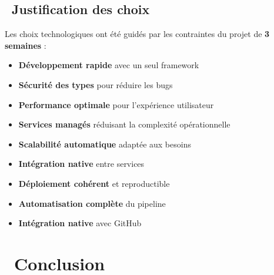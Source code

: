 \subsection{\faCheckCircle\ Justification des choix}

Les choix technologiques ont été guidés par les contraintes du projet de \textbf{\color{primaryblue}3 semaines} :

\begin{infobox}
\begin{itemize}
    \item \textcolor{primaryblue}{\textbf{Développement rapide}} avec un seul framework
    \item \textcolor{primaryblue}{\textbf{Sécurité des types}} pour réduire les bugs
    \item \textcolor{primaryblue}{\textbf{Performance optimale}} pour l'expérience utilisateur
\end{itemize}
\end{infobox}

\begin{infobox}
\begin{itemize}
    \item \textcolor{accentgreen}{\textbf{Services managés}} réduisant la complexité opérationnelle
    \item \textcolor{accentgreen}{\textbf{Scalabilité automatique}} adaptée aux besoins
    \item \textcolor{accentgreen}{\textbf{Intégration native}} entre services
\end{itemize}
\end{infobox}

\begin{infobox}
\begin{itemize}
    \item \textcolor{accentorange}{\textbf{Déploiement cohérent}} et reproductible
    \item \textcolor{accentorange}{\textbf{Automatisation complète}} du pipeline
    \item \textcolor{accentorange}{\textbf{Intégration native}} avec GitHub
\end{itemize}
\end{infobox}

\section{\faCheckCircle\ Conclusion}

